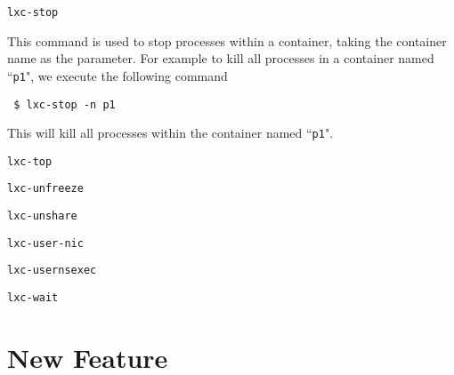 \documentclass[12pt]{article}
\begin{document}
{\texttt{lxc-stop}
\begin{dent}
This command is used to stop processes within a container, taking the container name as the parameter. For example to kill all processes in a container named ``\texttt{p1}", we execute the following command

\texttt{ \$ lxc-stop -n p1}

This will kill all processes within the container named ``\texttt{p1}".
\end{dent}
\texttt{lxc-top}

\texttt{lxc-unfreeze}

\texttt{lxc-unshare}

\texttt{lxc-user-nic}

\texttt{lxc-usernsexec}

\texttt{lxc-wait}

} %


\section{New Feature}
\end{document}
